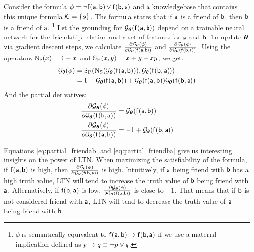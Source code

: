 Consider the formula $\phi = \lnot \mathsf{f}(\mathsf{a}, \mathsf{b}) \lor \mathsf{f}(\mathsf{b}, \mathsf{a})$
and a knowledgebase that contains this unique formula $\mathcal{K} = \{ \phi \}$.
The formula states that if $\mathsf{a}$ is a friend of $\mathsf{b}$, then $\mathsf{b}$ is a friend of $\mathsf{a}$.
    \footnote{$\phi$ is semantically equivalent to $\mathsf{f}(\mathsf{a}, \mathsf{b}) \rightarrow \mathsf{f}(\mathsf{b}, \mathsf{a})$ 
            if we use a material implication defined as $p \rightarrow q \equiv \lnot p \lor q$.}
Let the grounding for $\mathcal{G}_{\boldsymbol{\theta}}(\mathsf{f}(\mathsf{a}, \mathsf{b}))$ depend 
on a trainable neural network for the friendship relation
and a set of features for $\mathsf{a}$ and $\mathsf{b}$.
To update $\boldsymbol{\theta}$ via gradient descent steps, we calculate 
$\frac{\partial \mathcal{G}_{\boldsymbol{\theta}}(\phi)}{\partial \mathcal{G}_{\boldsymbol{\theta}}(\mathsf{f}(\mathsf{a},\mathsf{b}))}$ 
and 
$\frac{\partial \mathcal{G}_{\boldsymbol{\theta}}(\phi)}{\partial \mathcal{G}_{\boldsymbol{\theta}}(\mathsf{f}(\mathsf{b},\mathsf{a}))}$.
Using the operators $\operatorname{N_{S}}(x) = 1-x$ and $\operatorname{S_{P}}(x,y)=x+y-xy$, we get:
%
\begin{align}
    \mathcal{G}_{\boldsymbol{\theta}}(\phi) & =  \operatorname{S_{P}}(\operatorname{N_{S}}(\mathcal{G}_{\boldsymbol{\theta}}(\mathsf{f}(\mathsf{a},\mathsf{b}))), \mathcal{G}_{\boldsymbol{\theta}}(\mathsf{f}(\mathsf{b},\mathsf{a}))) \\
            & = 1 - \mathcal{G}_{\boldsymbol{\theta}}(\mathsf{f}(\mathsf{a},\mathsf{b})) + \mathcal{G}_{\boldsymbol{\theta}}(\mathsf{f}(\mathsf{a},\mathsf{b})) \mathcal{G}_{\boldsymbol{\theta}}(\mathsf{f}(\mathsf{b},\mathsf{a}))
\end{align}
And the partial derivatives:
\begin{align}
    \label{eq:partial_friendba} \frac{\partial \mathcal{G}_{\boldsymbol{\theta}}(\phi)}{\partial \mathcal{G}_{\boldsymbol{\theta}}(\mathsf{f}(\mathsf{b},\mathsf{a}))} & = \mathcal{G}_{\boldsymbol{\theta}}(\mathsf{f}(\mathsf{a},\mathsf{b})) \\
    \label{eq:partial_friendab} \frac{\partial \mathcal{G}_{\boldsymbol{\theta}}(\phi)}{\partial \mathcal{G}_{\boldsymbol{\theta}}(\mathsf{f}(\mathsf{a},\mathsf{b}))} & = -1+\mathcal{G}_{\boldsymbol{\theta}}(\mathsf{f}(\mathsf{b},\mathsf{a}))
\end{align}%

Equations \eqref{eq:partial_friendab} and \eqref{eq:partial_friendba} give us interesting insights on the power of LTN.
When maximizing the satisfiability of the formula, if $\mathsf{f}(\mathsf{a},\mathsf{b})$ is high,
then $\frac{\partial \mathcal{G}_{\boldsymbol{\theta}}(\phi)}{\partial \mathcal{G}_{\boldsymbol{\theta}}(\mathsf{f}(\mathsf{b},\mathsf{a}))}$ is high.
Intuitively, if $\mathsf{a}$ being friend with $\mathsf{b}$ has a high truth value, LTN will tend to increase the truth value of $\mathsf{b}$ being friend with $\mathsf{a}$.
Alternatively, if $\mathsf{f}(\mathsf{b},\mathsf{a})$ is low, $\frac{\partial \mathcal{G}_{\boldsymbol{\theta}}(\phi)}{\partial \mathcal{G}_{\boldsymbol{\theta}}(\mathsf{f}(\mathsf{a},\mathsf{b}))}$ is close to $-1$.
That means that if $\mathsf{b}$ is not considered friend with $\mathsf{a}$, LTN will tend to decrease the truth value of $\mathsf{a}$ being friend with $\mathsf{b}$.

